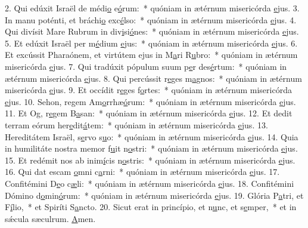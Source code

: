 2. Qui edúxit Israël de médi\uline{o} e\uline{ó}rum:~* quóniam in ætérnum misericórda \uline{e}jus.
3. In manu poténti, et bráchi\uline{o} exc\uline{é}lso:~* quóniam in ætérnum misericórda \uline{e}jus.
4. Qui divísit Mare Rubrum in div\uline{i}si\uline{ó}nes:~* quóniam in ætérnum misericórda \uline{e}jus.
5. Et edúxit Israël per m\uline{é}dium \uline{e}jus:~* quóniam in ætérnum misericórda \uline{e}jus.
6. Et excússit Pharaónem, et virtútem ejus in M\uline{a}ri R\uline{u}bro:~* quóniam in ætérnum misericórda \uline{e}jus.
7. Qui tradúxit pópulum suum p\uline{e}r des\uline{é}rtum:~* quóniam in ætérnum misericórda \uline{e}jus.
8. Qui percússit r\uline{e}ges m\uline{a}gnos:~* quóniam in ætérnum misericórda \uline{e}jus.
9. Et occídit r\uline{e}ges f\uline{o}rtes:~* quóniam in ætérnum misericórda \uline{e}jus.
10. Sehon, regem Am\uline{o}rrhæ\uline{ó}rum:~* quóniam in ætérnum misericórda \uline{e}jus.
11. Et Og, r\uline{e}gem B\uline{a}san:~* quóniam in ætérnum misericórda \uline{e}jus.
12. Et dedit terram eórum her\uline{e}dit\uline{á}tem:~* quóniam in ætérnum misericórda \uline{e}jus.
13. Hereditátem Israël, s\uline{e}rvo s\uline{u}o:~* quóniam in ætérnum misericórda \uline{e}jus.
14. Quia in humilitáte nostra memor f\uline{u}it n\uline{o}stri:~* quóniam in ætérnum misericórda \uline{e}jus.
15. Et redémit nos ab inim\uline{í}cis n\uline{o}stris:~* quóniam in ætérnum misericórda \uline{e}jus.
16. Qui dat escam \uline{o}mni c\uline{a}rni:~* quóniam in ætérnum misericórda \uline{e}jus.
17. Confitémini D\uline{e}o c\uline{æ}li:~* quóniam in ætérnum misericórda \uline{e}jus.
18. Confitémini Dómino d\uline{o}min\uline{ó}rum:~* quóniam in ætérnum misericórda \uline{e}jus.
19. Glória P\uline{a}tri, et F\uline{í}lio,~* et Spiríti S\uline{a}ncto.
20. Sicut erat in princípio, et n\uline{u}nc, et s\uline{e}mper,~* et in sǽcula sæculrum. \uline{A}men.
